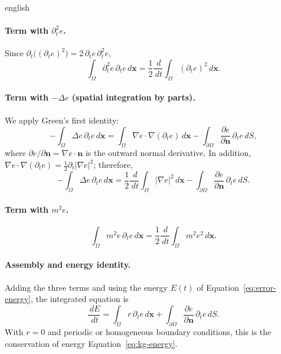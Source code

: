 \documentclass[11pt,letterpaper,twoside,openright]{book} %
\newcommand{\abs}[1]{\left\lvert #1 \right\rvert}
\begin{document}
\begin{hyphenrules}{english}
\paragraph{Term with $\partial_t^2e$.}
Since $\partial_t\big((\partial_te)^2\big)=2\,\partial_te\,\partial_t^2e$,
\[
  \int_\Omega\partial_t^2e\,\partial_te\,d\mathbf{x}=\frac12\frac{\,d}{\,d t}\int_\Omega(\partial_te)^2\,d\mathbf{x}.
\]

\paragraph{Term with $-\Delta e$ (spatial integration by parts).}
We apply Green's first identity:
\[
  -\int_\Omega\Delta e\,\partial_te\,d\mathbf{x}=\int_\Omega\nabla e\cdot\nabla(\partial_te)\,d\mathbf{x}
  -\int_{\partial\Omega}\frac{\partial e}{\partial\mathbf{n}}\,\partial_te\,d S,
\]
where $\partial e/\partial\mathbf{n}=\nabla e\cdot\mathbf{n}$ is the outward normal derivative. In addition,
$\nabla e\cdot\nabla(\partial_te)=\frac12\partial_t\abs{\nabla e}^2$; therefore,
\begin{equation}
  -\int_\Omega\Delta e\,\partial_te\,d\mathbf{x}=\frac12\frac{\,d}{\,d t}\int_\Omega\abs{\nabla e}^2\,d\mathbf{x}
  -\int_{\partial\Omega}\frac{\partial e}{\partial\mathbf{n}}\,\partial_te\,d S.
  \label{eq:app-lap}
\end{equation}

\paragraph{Term with $m^2e$.}
\[
  \int_\Omega m^2e\,\partial_te\,d\mathbf{x}=\frac12\frac{\,d}{\,d t}\int_\Omega m^2e^2\,d\mathbf{x}.
\]

\paragraph{Assembly and energy identity.}
Adding the three terms and using the energy $E(t)$ of Equation~\eqref{eq:error-energy}, the integrated equation is
\begin{equation}
  \frac{\,d E}{\,d t}=\int_\Omega r\,\partial_te\,d\mathbf{x}+\int_{\partial\Omega}\frac{\partial e}{\partial\mathbf{n}}\,\partial_te\,d S.
  \label{eq:app-identity}
\end{equation}
With $r=0$ and periodic or homogeneous boundary conditions, this is the conservation of energy
Equation~\eqref{eq:kg-energy}.


\end{hyphenrules}
\end{document}
